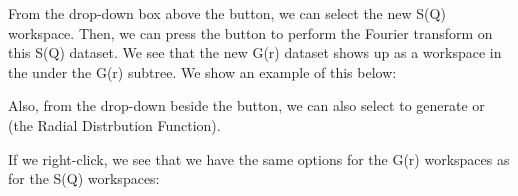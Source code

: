 From the drop-down box above the  button, we can select the new S(Q) workspace. Then, we can press the  button to perform the Fourier transform on this S(Q) dataset. We see that the new G(r) dataset shows up as a workspace in the  under the G(r) subtree. We show an example of this below:

\noindent{}

Also, from the drop-down beside the  button, we can also select to generate  or  (the Radial Distrbution Function).

If we right-click, we see that we have the same options for the G(r) workspaces as for the S(Q) workspaces:

\noindent{}

